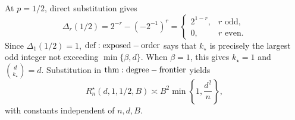At \(p=1/2\), direct substitution gives
\[
\Delta_r(1/2)=2^{-r}-(-2^{-1})^r
=\begin{cases}
2^{1-r},&r\text{ odd},\\
0,&r\text{ even}.
\end{cases}
\]
Since \(\Delta_1(1/2)=1\), \({\rm def:exposed-order}\) says that \(k_\star\) is precisely the largest odd integer not exceeding \(\min\{\beta,d\}\). When \(\beta=1\), this gives \(k_\star=1\) and \(\binom d{k_\star}=d\). Substitution in \({\rm thm:degree-frontier}\) yields
\[
R_n^\star(d,1,1/2,B)
\asymp B^2\min\!\left\{1,\frac{d^2}{n}\right\},
\]
with constants independent of \(n,d,B\).